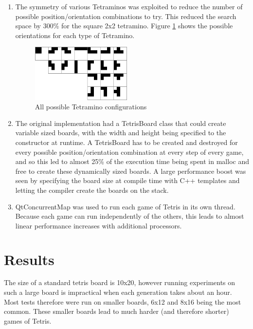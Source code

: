 \documentclass[a4paper,12pt]{article}
\begin{document}
\begin{enumerate}
  \item The symmetry of various Tetraminos was exploited to reduce the number
      of possible position/orientation combinations to try.
      This reduced the search space by 300\% for the square 2x2 tetramino.
      Figure \ref{Tetraminos} shows the possible orientations for each type
      of Tetramino.
      \begin{figure}[hb]
        \centering
        \includegraphics[width=5cm]{tetramino_grid.png}
        \caption{All possible Tetramino configurations}
        \label{Tetraminos}
      \end{figure}
      
  \item The original implementation had a TetrisBoard class that could create
      variable sized boards, with the width and height being specified to the
      constructor at runtime.
      A TetrisBoard has to be created and destroyed for every possible
      position/orientation combination at every step of every game, and so this
      led to almost 25\% of the execution time being spent in malloc and free
      to create these dynamically sized boards.
      A large performance boost was seen by specifying the board size at
      compile time with C++ templates and letting the compiler create the
      boards on the stack.
  
  \item QtConcurrentMap was used to run each game of Tetris in its own thread.
      Because each game can run independently of the others, this leads to
      almost linear performance increases with additional processors.
\end{enumerate}

\section{Results}

The size of a standard tetris board is 10x20, however running experiments on
such a large board is impractical when each generation takes about an hour.
Most tests therefore were run on smaller boards, 6x12 and 8x16 being the most
common.
These smaller boards lead to much harder (and therefore shorter) games of
Tetris.
\end{document}
